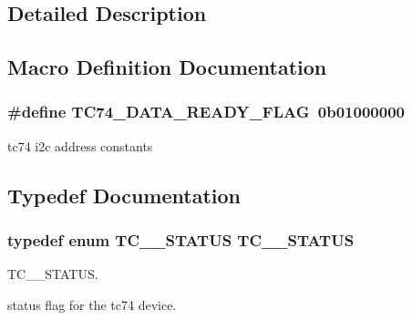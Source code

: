 \subsection{Detailed Description}


\subsection{Macro Definition Documentation}
\hypertarget{group__tc74__device__driver_gab77abc7de3ca9f3753905259d339069b}{
\subsubsection[{T\-C74\-\_\-\-D\-A\-T\-A\-\_\-\-R\-E\-A\-D\-Y\-\_\-\-F\-L\-A\-G}]{\setlength{\rightskip}{0pt plus 5cm}\#define T\-C74\-\_\-\-D\-A\-T\-A\-\_\-\-R\-E\-A\-D\-Y\-\_\-\-F\-L\-A\-G~0b01000000}}\label{group__tc74__device__driver_gab77abc7de3ca9f3753905259d339069b}
tc74 i2c address constants 

\subsection{Typedef Documentation}
\hypertarget{group__tc74__device__driver_ga974cb81ee48ba6da20d487bacf8b44c8}{
\subsubsection[{T\-C\-\_\-74\-\_\-\-S\-T\-A\-T\-U\-S}]{\setlength{\rightskip}{0pt plus 5cm}typedef enum {\bf T\-C\-\_\-\_\-\-S\-T\-A\-T\-U\-S} {\bf T\-C\-\_\-\_\-\-S\-T\-A\-T\-U\-S}}}\label{group__tc74__device__driver_ga974cb81ee48ba6da20d487bacf8b44c8}


T\-C\-\_\-\_\-\-S\-T\-A\-T\-U\-S. 

status flag for the tc74 device. 

